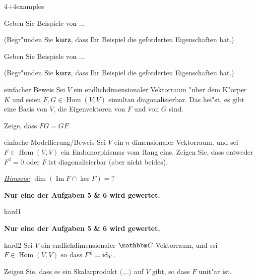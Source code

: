 \documentclass[a4paper]{article}
\DeclareMathOperator{\Hom}{Hom}
\DeclareMathOperator{\im}{Im}
\begin{document}
\pagebreak
\begin{klaufg}{4+4}{examples}


  Geben Sie Beispiele von ...

  (Begr"unden Sie {\bfseries\sffamily kurz}, dass Ihr Beispiel die
  geforderten Eigenschaften hat.)
  \pagebreak
  
    Geben Sie Beispiele von ...
  
  (Begr"unden Sie {\bfseries\sffamily kurz}, dass Ihr Beispiel die
  geforderten Eigenschaften hat.)

\end{klaufg}

\pagebreak
\begin{klaufg}{8}{einfacher Beweis}
  Sei $V$ ein endlichdimensionaler Vektorraum "uber dem K"orper $K$
  und seien $F,G \in \Hom(V,V)$ simultan diagonalisierbar. Das hei"st,
  es gibt eine Basis von $V$, die Eigenvektoren von $F$ und von $G$
  sind.

  Zeige, dass $FG=GF$.
\end{klaufg}

\pagebreak
\begin{klaufg}{8}{einfache Modellierung/Beweis}
  Sei $V$ ein $n$-dimensionaler Vektorraum, und sei $F \in \Hom(V,V)$
  ein Endomorphismus vom Rang eins.
  Zeigen Sie, dass entweder $F^2=0$ oder $F$ ist diagonalisierbar
  (aber nicht beides).

  \underline{\emph{Hinweis:}} $\dim(\im F \cap \ker F) = ?$
\end{klaufg}

\pagebreak
{\bfseries Nur eine der Aufgaben 5 \& 6 wird gewertet.}
\bigskip
\bigskip

\begin{klaufg}{8}{hard1}

\end{klaufg}

\pagebreak
{\bfseries Nur eine der Aufgaben 5 \& 6 wird gewertet.}
\bigskip
\bigskip

\begin{klaufg}{8}{hard2}
Sei $V$ ein endlichdimensionaler $\C$-Vektorraum, und sei $F \in
\Hom(V,V)$ so dass $F^6 = {\rm id}_V$.

Zeigen Sie, dass es ein Skalarprodukt $\langle .,. \rangle$ auf $V$
gibt, so dass $F$ unit"ar ist.  
\end{klaufg}
\end{document}
